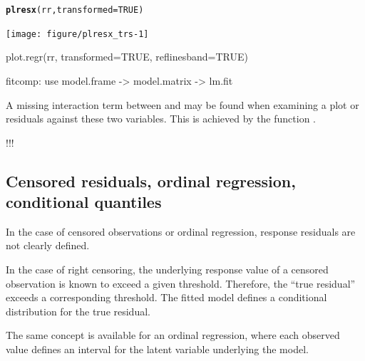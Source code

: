 \documentclass[11pt]{article}\usepackage[]{graphicx}\usepackage[]{color}
\makeatletter
\newcommand{\hlnum}[1]{\textcolor[rgb]{0.686,0.059,0.569}{#1}}%
\newcommand{\hlstd}[1]{\textcolor[rgb]{0.345,0.345,0.345}{#1}}%
\newcommand{\hlkwc}[1]{\textcolor[rgb]{0.333,0.667,0.333}{#1}}%
\newcommand{\hlkwd}[1]{\textcolor[rgb]{0.737,0.353,0.396}{\textbf{#1}}}%
\newenvironment{kframe}{%
 \def\at@end@of@kframe{}%
 \ifinner\ifhmode%
  \def\at@end@of@kframe{\end{minipage}}%
  \begin{minipage}{\columnwidth}%
 \fi\fi%
 \def\FrameCommand##1{\hskip\@totalleftmargin \hskip-\fboxsep
 \colorbox{shadecolor}{##1}\hskip-\fboxsep
     \hskip-\linewidth \hskip-\@totalleftmargin \hskip\columnwidth}%
 \MakeFramed {\advance\hsize-\width
   \@totalleftmargin\z@ \linewidth\hsize
   \@setminipage}}%
 {\par\unskip\endMakeFramed%
 \at@end@of@kframe}
\newenvironment{knitrout}{}{} %
\makeatother
\begin{document}
\begin{knitrout}
\color{fgcolor}\begin{kframe}
\begin{alltt}
\hlkwd{plresx}\hlstd{(rr,} \hlkwc{transformed}\hlstd{=}\hlnum{TRUE}\hlstd{)}
\end{alltt}


{\ttfamily\noindent{}}\end{kframe}
\texttt{[image: figure/plresx\_trs-1]} 

\end{knitrout}


plot.regr(rr, transformed=TRUE, reflinesband=TRUE)


fitcomp: use model.frame -> model.matrix -> lm.fit

A missing interaction term between  and  may be found when
examining a plot or residuals against these two variables.
This is achieved by the function .

!!!

\subsection{Censored residuals, ordinal regression, 
  conditional quantiles}

In the case of censored observations or ordinal regression,
response residuals are not clearly defined.

In the case of right censoring, the underlying response value of a censored
observation is known to exceed a given threshold. Therefore, the 
``true residual'' exceeds a corresponding threshold.
The fitted model defines a conditional distribution for the true residual.

The same concept is available for an ordinal regression, where each observed
value defines an interval for the latent variable underlying the model.
\end{document}
